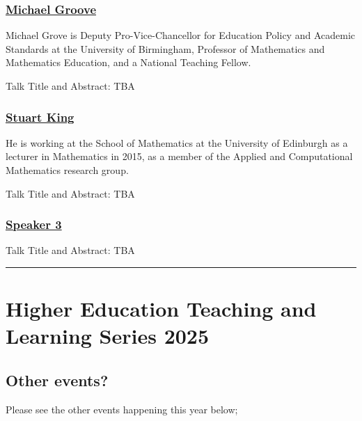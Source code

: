 \documentclass[
  letterpaper,
  DIV=11,
  numbers=noendperiod]{scrartcl}
\begin{document}
\hypertarget{michael-groove}{%
\subsubsection{\texorpdfstring{\href{https://www.birmingham.ac.uk/staff/profiles/maths/grove-michael}{Michael
Groove}}{Michael Groove}}\label{michael-groove}}

Michael Grove is Deputy Pro-Vice-Chancellor for Education Policy and
Academic Standards at the University of Birmingham, Professor of
Mathematics and Mathematics Education, and a National Teaching Fellow.

Talk Title and Abstract: TBA

\hypertarget{stuart-king}{%
\subsubsection{\texorpdfstring{\href{https://www.maths.ed.ac.uk/~sking3/index.html}{Stuart
King}}{Stuart King}}\label{stuart-king}}

He is working at the School of Mathematics at the University of
Edinburgh as a lecturer in Mathematics in 2015, as a member of the
Applied and Computational Mathematics research group.

Talk Title and Abstract: TBA

\hypertarget{speaker-3}{%
\subsubsection{\texorpdfstring{\href{}{Speaker
3}}{Speaker 3}}\label{speaker-3}}

Talk Title and Abstract: TBA

\begin{center}\rule{0.5\linewidth}{0.5pt}\end{center}

\hypertarget{higher-education-teaching-and-learning-series-2025}{%
\section{Higher Education Teaching and Learning Series
2025}\label{higher-education-teaching-and-learning-series-2025}}

\hypertarget{other-events}{%
\subsection{Other events?}\label{other-events}}

Please see the other events happening this year below;
\end{document}
